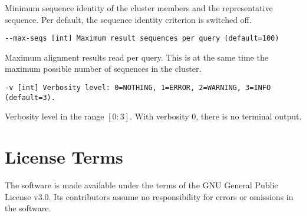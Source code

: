 \documentclass[11pt,a4paper]{scrreprt}
\begin{document}
Minimum sequence identity of the cluster members and the representative sequence. Per default, the sequence identity criterion is switched off.

\texttt{\small -{}-max-seqs {[}int{]} Maximum result sequences per query (default=100)}{\small \par}

Maximum alignment results read per query. This is at the same time the maximum possible number of sequences in the cluster.

\texttt{\small -v {[}int{]} Verbosity level: 0=NOTHING, 1=ERROR, 2=WARNING, 3=INFO (default=3).}{\small \par}

Verbosity level in the range $[0:3]$. With verbosity $0$, there is no terminal output.


\section{License Terms}
The software is made available under the terms of the GNU General Public License v3.0. Its contributors assume no responsibility for errors or omissions in the software.
\end{document}
